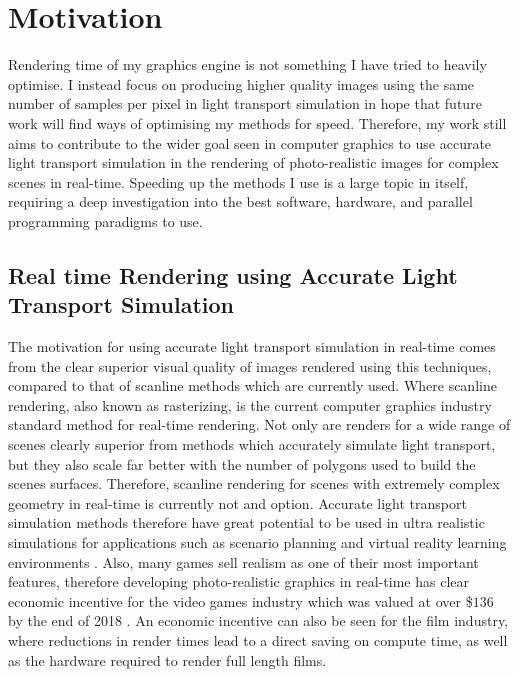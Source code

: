 \documentclass[ %
                    author={Callum Pearce},
                supervisor={Dr. Neill Campbell},
                    degree={MEng},
                     title={How effective are Temporal difference learning methods for reducing the number of zero contribution light paths while still accurately approximating Global Illumination in Path tracing?},
                  subtitle={},
                      type={research},
                      year={2019} ]{dissertation}
\begin{document}
\section{Motivation}
\label{sec:motivation}

Rendering time of my graphics engine is not something I have tried to heavily 
optimise. I instead focus on producing higher quality images using the same 
number of samples per pixel in light transport simulation in hope that future 
work will find ways of optimising my methods for speed. Therefore, my work 
still aims to contribute to the wider goal seen in computer graphics to use 
accurate light transport simulation in the rendering of photo-realistic images 
for complex scenes in real-time.  Speeding up the methods I use is a large 
topic in itself, requiring a deep investigation into the best software, hardware, 
and parallel programming paradigms to use.\\

\subsection{Real time Rendering using Accurate Light Transport Simulation}
The motivation for using accurate light transport simulation in real-time 
comes from the clear superior visual quality of images rendered using this 
techniques, compared to that of scanline methods which are currently used. 
Where scanline rendering, also known as rasterizing, is the current computer 
graphics industry standard method for real-time rendering. Not only are 
renders for a wide range of scenes clearly superior from methods which 
accurately simulate light transport, but they also scale far better with the 
number of polygons used to build the scenes surfaces. Therefore, scanline 
rendering for scenes with extremely complex geometry in real-time is currently 
not and option. Accurate light transport simulation methods therefore have 
great potential to be used in ultra realistic simulations for applications such 
as scenario planning and virtual reality learning environments \cite{pan2006virtual}. 
Also, many games sell realism as one of their most important features, therefore 
developing photo-realistic graphics in real-time has clear economic incentive for 
the video games industry which was valued at over \$$136$ by the end of 2018 
\cite{bloomberg.com}. An economic incentive can also be seen for the film
industry, where reductions in render times lead to a direct saving on compute 
time, as well as the hardware required to render full length films.
\end{document}
